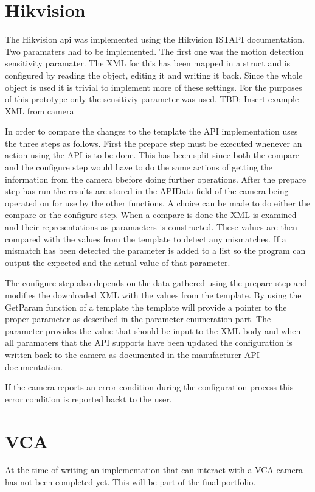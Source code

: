 \section{Hikvision}
The Hikvision api was implemented using the Hikvision ISTAPI documentation\cite{noauthor_intelligent_nodate}.
Two paramaters had to be implemented.
The first one was the motion detection sensitivity paramater.
The XML for this has been mapped in a struct and is configured by reading the object, editing it and writing it back.
Since the whole object is used it is trivial to implement more of these settings.
For the purposes of this prototype only the sensitiviy parameter was used.
TBD: Insert example XML from camera

In order to compare the changes to the template the API implementation uses the three steps as follows.
First the prepare step must be executed whenever an action using the API is to be done.
This has been split since both the compare and the configure step would have to do the same actions of getting the information from the camera bbefore doing further operations.
After the prepare step has run the results are stored in the APIData field of the camera being operated on for use by the other functions.
A choice can be made to do either the compare or the configure step.
When a compare is done the XML is examined and their representations as paramaeters is constructed.
These values are then compared with the values from the template to detect any mismatches.
If a mismatch has been detected the parameter is added to a list so the program can output the expected and the actual value of that parameter.

The configure step also depends on the data gathered using the prepare step and modifies the downloaded XML with the values from the template.
By using the GetParam function of a template the template will provide a pointer to the proper parameter as described in the parameter enumeration part.
The parameter provides the value that should be input to the XML body and when all paramaters that the API supports have been updated the configuration is written back to the camera as documented in the manufacturer API documentation.

If the camera reports an error condition during the configuration process this error condition is reported backt to the user.

\section{VCA}
At the time of writing an implementation that can interact with a VCA camera has not been completed yet.
This will be part of the final portfolio.
